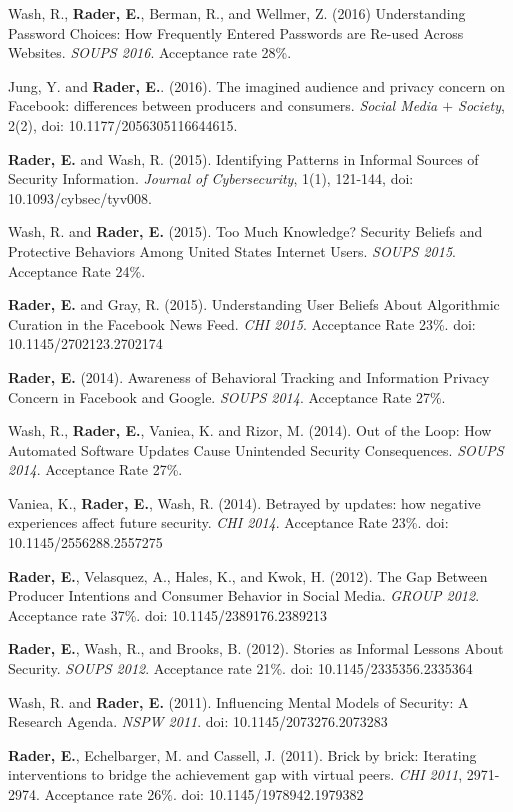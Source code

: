\documentclass[9pt]{extarticle}
\begin{document}
Wash, R., \textbf{Rader, E.}, Berman, R., and Wellmer, Z. (2016) Understanding Password Choices: How Frequently Entered Passwords are Re-used Across Websites. \emph{SOUPS 2016}. Acceptance rate 28\%.

Jung, Y. and \textbf{Rader, E.}. (2016). The imagined audience and privacy concern on Facebook: differences between producers and consumers. \emph{Social Media $+$ Society}, 2(2), doi: 10.1177/2056305116644615.

\textbf{Rader, E.} and Wash, R. (2015). Identifying Patterns in Informal Sources of Security Information. \emph{Journal of Cybersecurity}, 1(1), 121-144, doi: 10.1093/cybsec/tyv008.

Wash, R. and \textbf{Rader, E.} (2015). Too Much Knowledge? Security Beliefs and Protective Behaviors Among United States Internet Users. \emph{SOUPS 2015}. Acceptance Rate 24\%.

\textbf{Rader, E.} and Gray, R. (2015). Understanding User Beliefs About Algorithmic Curation in the Facebook News Feed. \emph{CHI 2015}. Acceptance Rate 23\%. doi: 10.1145/2702123.2702174

\textbf{Rader, E.} (2014). Awareness of Behavioral Tracking and Information Privacy Concern in Facebook and Google. \emph{SOUPS 2014}. Acceptance Rate 27\%.

Wash, R., \textbf{Rader, E.}, Vaniea, K. and Rizor, M. (2014). Out of the Loop: How Automated Software Updates Cause Unintended Security Consequences. \emph{SOUPS 2014}. Acceptance Rate 27\%.

Vaniea, K., \textbf{Rader, E.}, Wash, R. (2014). Betrayed by updates: how negative experiences affect future security. \emph{CHI 2014}. Acceptance Rate 23\%. doi: 10.1145/2556288.2557275

\textbf{Rader, E.}, Velasquez, A., Hales, K., and Kwok, H. (2012). The Gap Between Producer Intentions and Consumer Behavior in Social Media. \emph{GROUP 2012}. Acceptance rate 37\%. doi: 10.1145/2389176.2389213

\textbf{Rader, E.}, Wash, R., and Brooks, B. (2012). Stories as Informal Lessons About Security. \emph{SOUPS 2012}. Acceptance rate 21\%. doi: 10.1145/2335356.2335364

Wash, R. and \textbf{Rader, E.} (2011). Influencing Mental Models of Security: A Research Agenda. \emph{NSPW 2011}. doi: 10.1145/2073276.2073283

\textbf{Rader, E.}, Echelbarger, M. and Cassell, J. (2011). Brick by brick: Iterating interventions to bridge the achievement gap with virtual peers. \emph{CHI 2011}, 2971-2974. Acceptance rate 26\%. doi: 10.1145/1978942.1979382
\end{document}
